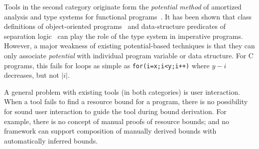 \documentclass{sigplanconf}
\begin{document}
Tools in the second category originate form the {\em potential method}
of amortized analysis and type systems for functional
programs~\cite{Jost03,HoffmannAH12}. It has been shown that class
definitions of object-oriented programs~\cite{Jost06} and
data-structure predicates of separation logic~\cite{Atkey10} can play
the role of the type system in imperative programs.
However, a major weakness of existing potential-based techniques
is that they can only associate \emph{potential}
with individual program variable or data structure.
For C programs, this
fails for loops as simple as \lstinline{for(i=x;i<y;i++)} where
$y-i$ decreases, but not $|i|$. %


A general problem with existing tools (in both categories) is user interaction. When a tool
fails to find a resource bound for a program, there is no possibility
for sound user interaction to guide the tool during bound
derivation.
For example, there is no concept of manual proofs of
resource bounds; and no framework can support composition
of manually derived bounds with automatically inferred bounds.

\end{document}
